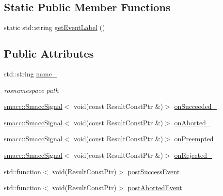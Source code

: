 \subsection*{Static Public Member Functions}
\begin{DoxyCompactItemize}
\item 
static std\+::string \hyperlink{classsmacc_1_1client__bases_1_1SmaccActionClientBase_a283e68df89e8f40d2f3251cbdbff1430}{get\+Event\+Label} ()
\end{DoxyCompactItemize}
\subsection*{Public Attributes}
\begin{DoxyCompactItemize}
\item 
std\+::string \hyperlink{classsmacc_1_1client__bases_1_1SmaccActionClientBase_a7f2e1834e915bdf7ae9db8b90b4597e6}{name\+\_\+}
\begin{DoxyCompactList}\small\item\em rosnamespace path \end{DoxyCompactList}\item 
\hyperlink{classsmacc_1_1SmaccSignal}{smacc\+::\+Smacc\+Signal}$<$ void(const Result\+Const\+Ptr \&)$>$ \hyperlink{classsmacc_1_1client__bases_1_1SmaccActionClientBase_afa1d615e16c9e825d815a3a3ccaa61df}{on\+Succeeded\+\_\+}
\item 
\hyperlink{classsmacc_1_1SmaccSignal}{smacc\+::\+Smacc\+Signal}$<$ void(const Result\+Const\+Ptr \&)$>$ \hyperlink{classsmacc_1_1client__bases_1_1SmaccActionClientBase_adc33748ca4fcef9730f8039b75d496d0}{on\+Aborted\+\_\+}
\item 
\hyperlink{classsmacc_1_1SmaccSignal}{smacc\+::\+Smacc\+Signal}$<$ void(const Result\+Const\+Ptr \&)$>$ \hyperlink{classsmacc_1_1client__bases_1_1SmaccActionClientBase_a23846f928b48b5da809690883044b14b}{on\+Preempted\+\_\+}
\item 
\hyperlink{classsmacc_1_1SmaccSignal}{smacc\+::\+Smacc\+Signal}$<$ void(const Result\+Const\+Ptr \&)$>$ \hyperlink{classsmacc_1_1client__bases_1_1SmaccActionClientBase_a4c878cbf2684701323e2b36668f7d721}{on\+Rejected\+\_\+}
\item 
std\+::function$<$ void(Result\+Const\+Ptr)$>$ \hyperlink{classsmacc_1_1client__bases_1_1SmaccActionClientBase_afb4f82508cd653d496392f321e84a783}{post\+Success\+Event}
\item 
std\+::function$<$ void(Result\+Const\+Ptr)$>$ \hyperlink{classsmacc_1_1client__bases_1_1SmaccActionClientBase_a9ca2952ededeec233ee6d8a9a39c680b}{post\+Aborted\+Event}

\end{DoxyCompactItemize}
